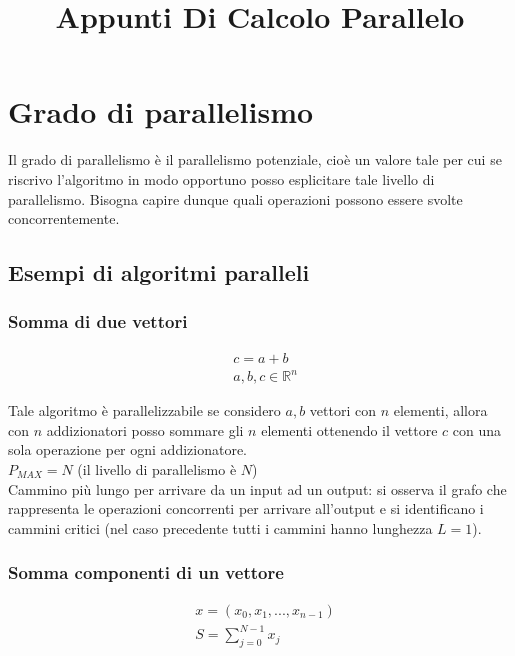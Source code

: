 \documentclass[a4paper,portrait,12pt]{article}
\theoremstyle{definition}
\begin{document}
\title{Appunti Di Calcolo Parallelo}

\maketitle
\date
\newpage

\tableofcontents
\newpage


\section{Grado di parallelismo}

Il grado di parallelismo è il parallelismo potenziale, cioè un valore tale per cui se riscrivo l'algoritmo in modo opportuno posso esplicitare tale livello di parallelismo. Bisogna capire dunque quali operazioni possono essere svolte concorrentemente.

\subsection{Esempi di algoritmi paralleli}

\subsubsection{Somma di due vettori}
\begin{align*}
&c = a + b\\
&a, b, c \in \mathbb{R}^n
\end{align*}



Tale algoritmo è parallelizzabile se considero $a,b$ vettori con $n$ elementi, allora con $n$ addizionatori posso sommare gli $n$ elementi ottenendo il vettore $c$ con una sola operazione per ogni addizionatore.\\
$P_{MAX} = N$ (il livello di parallelismo è $N$)\\

Cammino più lungo per arrivare da un input ad un output: si osserva il grafo che rappresenta le operazioni concorrenti per arrivare all’output e si identificano i cammini critici (nel caso precedente tutti i cammini hanno lunghezza $L = 1$).\\

\subsubsection{Somma componenti di un vettore}
\begin{align*}
&x = (x_0,x_1,...,x_{n-1})\\
&S = \sum_{j=0}^{N-1}x_j
\end{align*}
\end{document}
